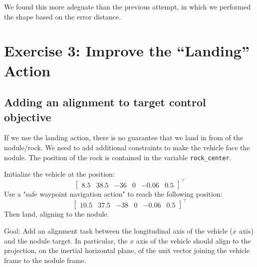 \documentclass{article}
\begin{document}
We found this more adeguate than the previous attempt, in which we performed the shape based on the error distance.
\clearpage

\section{Exercise 3: Improve the “Landing” Action}
\subsection{Adding an alignment to target control objective}
If we use the landing action, there is no guarantee that we land in from of the nodule/rock. We need to add additional constraints to make the vehicle face the nodule. The position of the rock is contained in the variable \texttt{rock\_center}. 

Initialize the vehicle at the position:
\begin{displaymath}
\begin{bmatrix} 8.5 & 38.5 & -36 & 0 & -0.06 & 0.5 \end{bmatrix}^\top
\end{displaymath} 
Use a "safe waypoint navigation action" to reach the following position: 
\begin{displaymath}
\begin{bmatrix} 10.5 & 37.5 & -38 & 0 & -0.06 & 0.5 \end{bmatrix}^\top
\end{displaymath} 
Then land, aligning to the nodule.

Goal: Add an alignment task between the longitudinal axis of the vehicle ($x$ axis) and the nodule target. In particular, the $x$ axis of the vehicle should align to the projection, on the inertial horizontal plane, of the unit vector joining the vehicle frame to the nodule frame.
\end{document}
